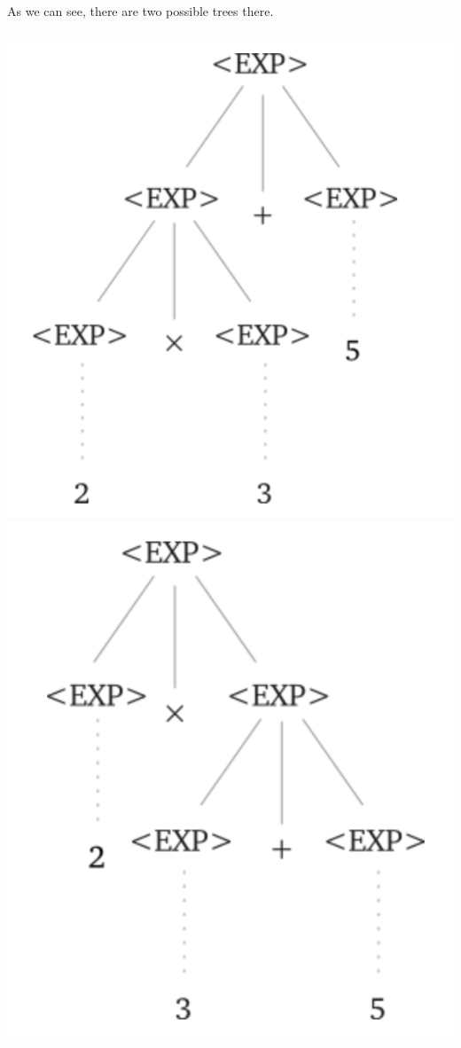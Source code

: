 \documentclass[11pt]{article}
\begin{document}
\newpage
As we can see, there are two possible trees there.\\\\
\includegraphics[scale = 0.6]{images/1}
\includegraphics[scale = 0.6]{images/2}\\\\
\end{document}
